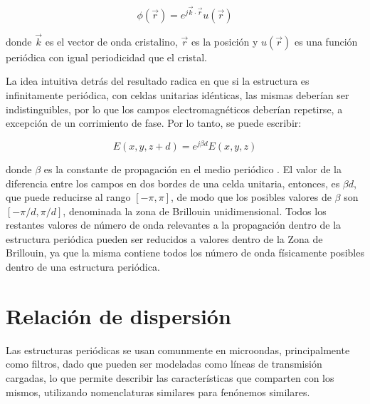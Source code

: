 \begin{equation}
\phi(\vec{r}) = e^{j\vec{k} \cdot \vec{r}} u(\vec{r})
\end{equation}

donde $\vec{k}$ es el vector de onda cristalino, $\vec{r}$ es la posición y $u(\vec{r})$ es una función periódica con igual periodicidad que el cristal.

La idea intuitiva detrás del resultado radica en que si la estructura es infinitamente periódica, con celdas unitarias idénticas, las mismas deberían ser indistinguibles, por lo que los campos electromagnéticos deberían repetirse, a excepción de un corrimiento de fase. Por lo tanto, se puede escribir:

\begin{equation}
	E(x,y,z+d) = e^{j \beta d} E(x,y,z)
\end{equation}

donde $\beta$ es la constante de propagación en el medio periódico \cite{TaylorandFrancis}. El valor de la diferencia entre los campos en dos bordes de una celda unitaria, entonces, es $\beta d$, que puede reducirse al rango $[-\pi,\pi]$, de modo que los posibles valores de $\beta$ son $[-\pi/d,\pi/d]$, denominada la zona de Brillouin unidimensional. Todos los restantes valores de número de onda relevantes a la propagación dentro de la estructura periódica pueden ser reducidos a valores dentro de la Zona de Brillouin, ya que la misma contiene todos los número de onda físicamente posibles dentro de una estructura periódica.

\section{Relación de dispersión}
\label{sec_bloch}

Las estructuras periódicas se usan comunmente en microondas, principalmente como filtros, dado que pueden ser modeladas como líneas de transmisión cargadas, lo que permite describir las características que comparten con los mismos, utilizando nomenclaturas similares para fenónemos similares.

